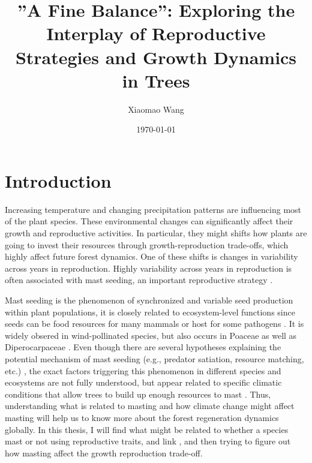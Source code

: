 \documentclass[11pt,letter]{article}
\begin{document}
\title{”A Fine Balance'': Exploring the Interplay of Reproductive Strategies and Growth Dynamics in Trees}
\author{Xiaomao Wang} 
\date{\today}
\maketitle

\setlength{\parindent}{0pt}
\setlength{\parskip}{3pt}

\section{Introduction}
Increasing temperature and changing precipitation patterns are influencing most of the plant species. These environmental changes can significantly affect their growth and reproductive activities. In particular, they might shifts how plants are going to invest their resources through growth-reproduction trade-offs, which highly affect future forest dynamics. One of these shifts is changes in variability across years in reproduction. Highly variability across years in reproduction is often associated with mast seeding, an important reproductive strategy \citep{pearse2016mechanisms}.\par
Mast seeding is the phenomenon of synchronized and variable seed production within plant populations, it is closely related to ecosystem-level functions since seeds can be food resources for many mammals or host for some pathogens  \citep{janzen1971seed, kelly1994evolutionary, davies2024seed}. It is widely obsered in wind-pollinated species, but also occurs in Poaceae as well as Diperocarpaceae  \citep{kelly2002mast}. Even though there are several hypotheses explaining the potential mechanism of mast seeding (e.g., predator satiation, resource matching, etc.)  \citep{koenig2021brief}, the exact factors triggering this phenomenon in different species and ecosystems are not fully understood, but appear related to specific climatic conditions that allow trees to build up enough resources to mast  \citep{pearse2016mechanisms}. Thus, understanding what is related to masting and how climate change might affect masting will help us to know more about the forest regeneration dynamics globally. In this thesis, I will find what might be related to whether a species mast or not using reproductive traits, and link , and then trying to figure out how masting affect the growth reproduction trade-off.
\end{document}
